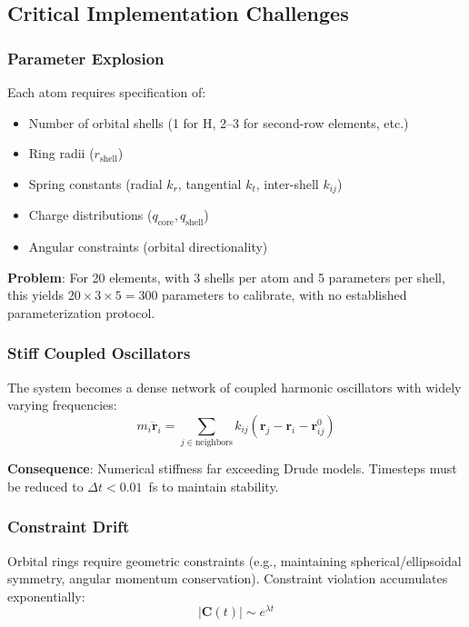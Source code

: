 \documentclass[11pt,letterpaper]{article}
\newcommand{\vr}{\mathbf{r}}
\begin{document}
\subsection{Critical Implementation Challenges}

\subsubsection{Parameter Explosion}

Each atom requires specification of:
\begin{itemize}
    \item Number of orbital shells (1 for H, 2--3 for second-row elements, etc.)
    \item Ring radii ($r_{\text{shell}}$)
    \item Spring constants (radial $k_r$, tangential $k_t$, inter-shell $k_{ij}$)
    \item Charge distributions ($q_{\text{core}}, q_{\text{shell}}$)
    \item Angular constraints (orbital directionality)
\end{itemize}

\textbf{Problem}: For 20 elements, with 3 shells per atom and 5 parameters per shell, this yields $20 \times 3 \times 5 = 300$ parameters to calibrate, with no established parameterization protocol.

\subsubsection{Stiff Coupled Oscillators}

The system becomes a dense network of coupled harmonic oscillators with widely varying frequencies:
\begin{equation}
m_i \ddot{\vr}_i = \sum_{j \in \text{neighbors}} k_{ij} (\vr_j - \vr_i - \vr_{ij}^0)
\end{equation}

\textbf{Consequence}: Numerical stiffness far exceeding Drude models. Timesteps must be reduced to $\Delta t < 0.01$~fs to maintain stability.

\subsubsection{Constraint Drift}

Orbital rings require geometric constraints (e.g., maintaining spherical/ellipsoidal symmetry, angular momentum conservation). Constraint violation accumulates exponentially:
\begin{equation}
|\mathbf{C}(t)| \sim e^{\lambda t}
\end{equation}
\end{document}
